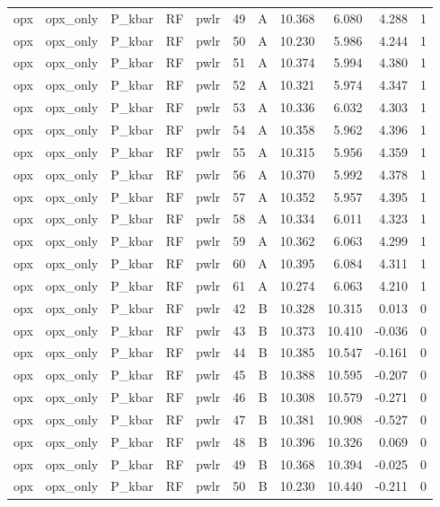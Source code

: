 \begin{longtable}{lllllrrrrrr}
opx & opx\_only & P\_kbar & RF & pwlr & 49 & A & 10.368 & 6.080 & 4.288 & 1 \\
opx & opx\_only & P\_kbar & RF & pwlr & 50 & A & 10.230 & 5.986 & 4.244 & 1 \\
opx & opx\_only & P\_kbar & RF & pwlr & 51 & A & 10.374 & 5.994 & 4.380 & 1 \\
opx & opx\_only & P\_kbar & RF & pwlr & 52 & A & 10.321 & 5.974 & 4.347 & 1 \\
opx & opx\_only & P\_kbar & RF & pwlr & 53 & A & 10.336 & 6.032 & 4.303 & 1 \\
opx & opx\_only & P\_kbar & RF & pwlr & 54 & A & 10.358 & 5.962 & 4.396 & 1 \\
opx & opx\_only & P\_kbar & RF & pwlr & 55 & A & 10.315 & 5.956 & 4.359 & 1 \\
opx & opx\_only & P\_kbar & RF & pwlr & 56 & A & 10.370 & 5.992 & 4.378 & 1 \\
opx & opx\_only & P\_kbar & RF & pwlr & 57 & A & 10.352 & 5.957 & 4.395 & 1 \\
opx & opx\_only & P\_kbar & RF & pwlr & 58 & A & 10.334 & 6.011 & 4.323 & 1 \\
opx & opx\_only & P\_kbar & RF & pwlr & 59 & A & 10.362 & 6.063 & 4.299 & 1 \\
opx & opx\_only & P\_kbar & RF & pwlr & 60 & A & 10.395 & 6.084 & 4.311 & 1 \\
opx & opx\_only & P\_kbar & RF & pwlr & 61 & A & 10.274 & 6.063 & 4.210 & 1 \\
opx & opx\_only & P\_kbar & RF & pwlr & 42 & B & 10.328 & 10.315 & 0.013 & 0 \\
opx & opx\_only & P\_kbar & RF & pwlr & 43 & B & 10.373 & 10.410 & -0.036 & 0 \\
opx & opx\_only & P\_kbar & RF & pwlr & 44 & B & 10.385 & 10.547 & -0.161 & 0 \\
opx & opx\_only & P\_kbar & RF & pwlr & 45 & B & 10.388 & 10.595 & -0.207 & 0 \\
opx & opx\_only & P\_kbar & RF & pwlr & 46 & B & 10.308 & 10.579 & -0.271 & 0 \\
opx & opx\_only & P\_kbar & RF & pwlr & 47 & B & 10.381 & 10.908 & -0.527 & 0 \\
opx & opx\_only & P\_kbar & RF & pwlr & 48 & B & 10.396 & 10.326 & 0.069 & 0 \\
opx & opx\_only & P\_kbar & RF & pwlr & 49 & B & 10.368 & 10.394 & -0.025 & 0 \\
opx & opx\_only & P\_kbar & RF & pwlr & 50 & B & 10.230 & 10.440 & -0.211 & 0 \\

\end{longtable}
